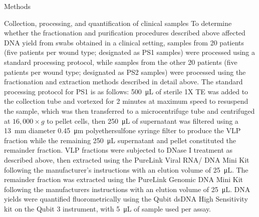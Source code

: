 \documentclass[oneside,12pt,final]{sty/ucthesis-CA2012}
\begin{document}
\begin{mainmatter}
\begin{section}{Methods}
\begin{subsection}{Collection, processing, and quantification of clinical samples}
To determine whether the fractionation and purification procedures described above affected DNA yield from swabs obtained in a clinical setting, samples from 20 patients (five patients per wound type; designated as PS1 samples) were processed using a standard processing protocol, while samples from the other 20 patients (five patients per wound type; designated as PS2 samples) were processed using the fractionation and extraction methods described in detail above. The standard processing protocol for PS1 is as follows: \SI{500}{\micro\liter} of sterile 1X TE was added to the collection tube and vortexed for 2 minutes at maximum speed to resuspend the sample, which was then transferred to a microcentrifuge tube and centrifuged at $16,000 \times g$ to pellet cells, then \SI{250}{\micro\liter} of supernatant was filtered using a \SI{13}{\milli\meter} diameter \SI{0.45}{\micro\meter} polyethersulfone syringe filter to produce the VLP fraction while the remaining \SI{250}{\micro\liter} supernatant and pellet constituted the remainder fraction. VLP fractions were subjected to DNase I treatment as described above, then extracted using the PureLink Viral RNA/ DNA Mini Kit following the manufacturer’s instructions with an elution volume of \SI{25}{\micro\liter}. The remainder fraction was extracted using the PureLink Genomic DNA Mini Kit following the manufacturers instructions with an elution volume of \SI{25}{\micro\liter}. DNA yields were quantified fluorometrically using the Qubit dsDNA High Sensitivity kit on the Qubit 3 instrument, with \SI{5}{\micro\liter} of sample used per assay.
\end{subsection}


\end{section}
\end{mainmatter}
\end{document}

